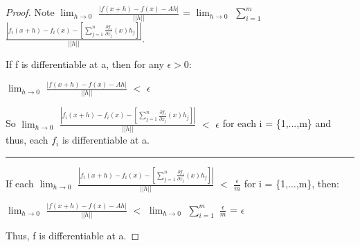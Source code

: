     \begin{proof}
        Note
        $\lim_{h \rightarrow 0}$ $\frac{|f(x+h)-f(x)-Ah|}{||h||}$
        = $\lim_{h \rightarrow 0}$ $\sum_{i=1}^m$
            $\frac{|f_i(x+h) - f_i(x)
                    - [\sum_{j=1}^n \frac{\partial f_i}{\partial x_j}(x)h_j]|}
                {||h||}$.

        If f is differentiable at a, then for any $\epsilon > 0$:

        \hspace{0.5cm}
        $\lim_{h \rightarrow 0}$ $\frac{|f(x+h)-f(x)-Ah|}{||h||}$
        $<$ $\epsilon$

        So $\lim_{h \rightarrow 0}$
                $\frac{|f_i(x+h) - f_i(x)
                - [\sum_{j=1}^n \frac{\partial f_i}{\partial x_j}(x)h_j]|}{||h||}$
            $<$ $\epsilon$
        for each i = \{1,...,m\}
        and thus, each $f_i$ is differentiable at a.

        \rule[0.1cm]{15cm}{0.01cm}

        If each $\lim_{h \rightarrow 0}$
                $\frac{|f_i(x+h) - f_i(x)
                - [\sum_{j=1}^n \frac{\partial f_i}{\partial x_j}(x)h_j]|}{||h||}$
                $<$ $\frac{\epsilon}{m}$
        for i = \{1,...,m\}, then:

        \hspace{0.5cm}
        $\lim_{h \rightarrow 0}$ $\frac{|f(x+h)-f(x)-Ah|}{||h||}$
        $<$ $\lim_{h \rightarrow 0}$ $\sum_{i=1}^m$ $\frac{\epsilon}{m}$
        = $\epsilon$

        Thus, f is differentiable at a.
    \end{proof}

    \vspace{0.5cm}

    

